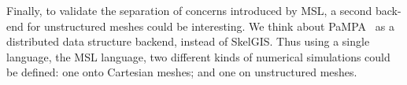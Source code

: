 Finally, to validate the separation of concerns introduced by MSL, a second back-end for unstructured meshes could be interesting. We think about PaMPA~\cite{lachat:hal-00768916} as a distributed data structure backend, instead of SkelGIS. Thus using a single language, the MSL language, two different kinds of numerical simulations could be defined: one onto Cartesian meshes; and one on unstructured meshes.


